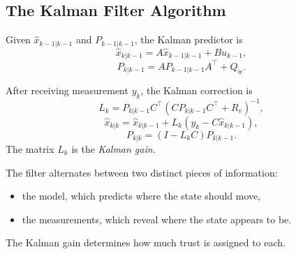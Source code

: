 \subsection{The Kalman Filter Algorithm}
\label{sec:l7-the-kalman-filter-algorithm}

\begin{definition}\label{def:l7-prediction-step}
	Given $\hat x_{k-1|k-1}$ and $P_{k-1|k-1}$, the Kalman predictor is
	\[
		\hat x_{k|k-1}=A\hat x_{k-1|k-1}+Bu_{k-1},
	\]
	\[
		P_{k|k-1}=A P_{k-1|k-1}A^\top + Q_w.
	\]
\end{definition}

\begin{definition}\label{def:l7-correction-step}
	After receiving measurement $y_k$, the Kalman correction is
	\[
		L_k = P_{k|k-1}C^\top\left(CP_{k|k-1}C^\top + R_v\right)^{-1},
	\]
	\[
		\hat x_{k|k}=\hat x_{k|k-1}+L_k\left(y_k-C\hat x_{k|k-1}\right),
	\]
	\[
		P_{k|k}=(I-L_k C)P_{k|k-1}.
	\]
	The matrix $L_k$ is the \emph{Kalman gain}.
\end{definition}

\begin{remark}
	The filter alternates between two distinct pieces of information:
	\begin{itemize}
		\item the model, which predicts where the state should move,
		\item the measurements, which reveal where the state appears to be.
	\end{itemize}
	The Kalman gain determines how much trust is assigned to each.
\end{remark}

\begin{algorithm}[H]
	\DontPrintSemicolon
	\caption{Discrete-Time Kalman Filter}
\label{alg:l7-discrete-time-kalman-filter}
\end{algorithm}

